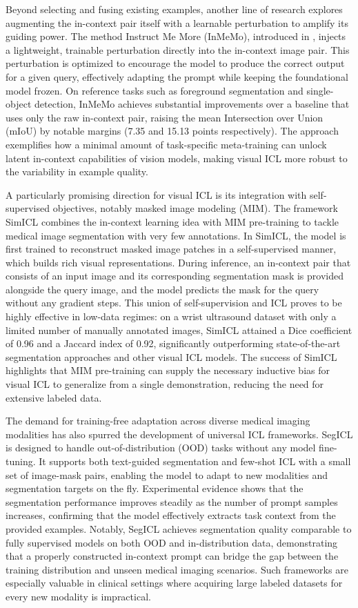 \documentclass[11pt]{article}
\begin{document}
Beyond selecting and fusing existing examples, another line of research explores augmenting the in-context pair itself with a learnable perturbation to amplify its guiding power. The method Instruct Me More (InMeMo), introduced in \cite{ref113}, injects a lightweight, trainable perturbation directly into the in-context image pair. This perturbation is optimized to encourage the model to produce the correct output for a given query, effectively adapting the prompt while keeping the foundational model frozen. On reference tasks such as foreground segmentation and single-object detection, InMeMo achieves substantial improvements over a baseline that uses only the raw in-context pair, raising the mean Intersection over Union (mIoU) by notable margins (7.35 and 15.13 points respectively). The approach exemplifies how a minimal amount of task-specific meta-training can unlock latent in-context capabilities of vision models, making visual ICL more robust to the variability in example quality.

A particularly promising direction for visual ICL is its integration with self-supervised objectives, notably masked image modeling (MIM). The framework SimICL \cite{ref114} combines the in-context learning idea with MIM pre-training to tackle medical image segmentation with very few annotations. In SimICL, the model is first trained to reconstruct masked image patches in a self-supervised manner, which builds rich visual representations. During inference, an in-context pair that consists of an input image and its corresponding segmentation mask is provided alongside the query image, and the model predicts the mask for the query without any gradient steps. This union of self-supervision and ICL proves to be highly effective in low-data regimes: on a wrist ultrasound dataset with only a limited number of manually annotated images, SimICL attained a Dice coefficient of 0.96 and a Jaccard index of 0.92, significantly outperforming state-of-the-art segmentation approaches and other visual ICL models. The success of SimICL highlights that MIM pre-training can supply the necessary inductive bias for visual ICL to generalize from a single demonstration, reducing the need for extensive labeled data.

The demand for training-free adaptation across diverse medical imaging modalities has also spurred the development of universal ICL frameworks. SegICL \cite{ref115} is designed to handle out-of-distribution (OOD) tasks without any model fine-tuning. It supports both text-guided segmentation and few-shot ICL with a small set of image-mask pairs, enabling the model to adapt to new modalities and segmentation targets on the fly. Experimental evidence shows that the segmentation performance improves steadily as the number of prompt samples increases, confirming that the model effectively extracts task context from the provided examples. Notably, SegICL achieves segmentation quality comparable to fully supervised models on both OOD and in-distribution data, demonstrating that a properly constructed in-context prompt can bridge the gap between the training distribution and unseen medical imaging scenarios. Such frameworks are especially valuable in clinical settings where acquiring large labeled datasets for every new modality is impractical.
\end{document}
